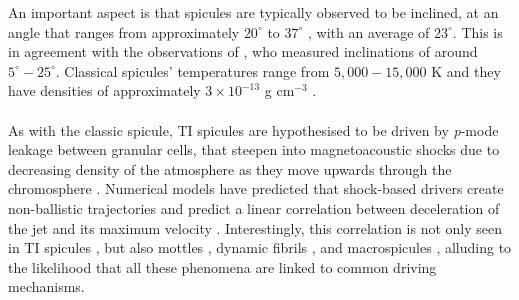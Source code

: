 \documentclass[12pt]{ociamthesis}
\newcommand{\np}{\\ \\}
\begin{document}
%
An important aspect is that spicules are typically observed to be inclined, at an angle that ranges from approximately $20^{\circ}$ \citep{Beckers1968} to $37^{\circ}$ \citep{Trujillo2005ApJ619L191T}, with an average of $23^{\circ}$. This is in agreement with the observations of \cite{Pereira2012}, who measured inclinations of around $5^{\circ}-25^{\circ}$. Classical spicules' temperatures range from $5,000-15,000$ K and they have densities of approximately $3\times10^{-13}$ g cm$^{-3}$ \citep{Sterling_2000SoPh}. \np 
%
As with the classic spicule, TI spicules are hypothesised to be driven by \textit{p}-mode leakage between granular cells, that steepen into magnetoacoustic shocks due to decreasing density of the atmosphere as they move upwards through the chromosphere \citep{Pontieu2004Natur, Pontieu2007PASJ, Mart2009ApJ7011569M}. Numerical models have predicted that shock-based drivers create non-ballistic trajectories and predict a linear correlation between deceleration of the jet and its maximum velocity \citep{Heggland2007ApJ6661277H}. Interestingly, this correlation is not only seen in TI spicules \citep{Pereira2012}, but also mottles \citep{Rouppe2007ApJ660L169R}, dynamic fibrils \citep{De_Pontieu2007ApJ}, and macrospicules \citep{Loboda2019ApJ871230L}, alluding to the likelihood that all these phenomena are linked to common driving mechanisms.
\end{document}
